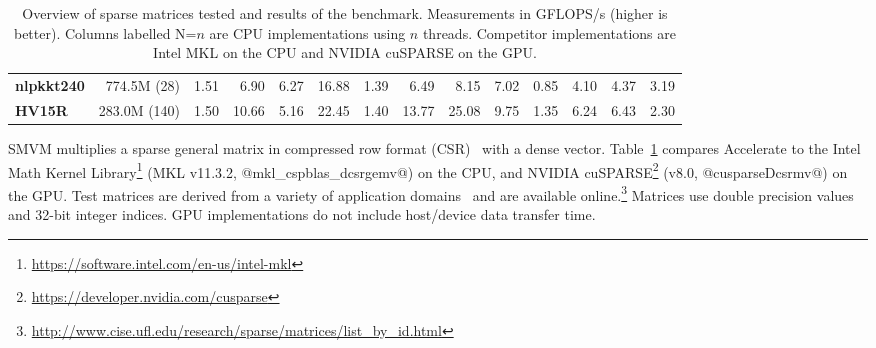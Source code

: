 \begin{table}
\begin{small}
\begin{center}
{\begin{tabular}{lrrrrrrrrrrrrr}
  \textbf{nlpkkt240}    & 774.5M (28)
                        & 1.51
                        & 6.90
                        & 6.27
                        & 16.88
                        & 1.39
                        & 6.49
                        & 8.15
                        & 7.02
                        & 0.85
                        & 4.10
                        & 4.37
                        & 3.19
                        \\

  \textbf{HV15R}        & 283.0M (140)
                        & 1.50
                        & 10.66
                        & 5.16
                        & 22.45
                        & 1.40
                        & 13.77
                        & 25.08
                        & 9.75
                        & 1.35
                        & 6.24
                        & 6.43
                        & 2.30
                        \\

  \bottomrule
\end{tabular}}
\end{center}
\end{small}
\caption{Overview of sparse matrices tested and results of the benchmark.
Measurements in GFLOPS/s (higher is better). Columns labelled N=$n$ are CPU
implementations using $n$ threads. Competitor implementations are Intel MKL on
the CPU and NVIDIA cuSPARSE on the GPU.}
\label{tab:smvm}
\end{table}

SMVM multiplies a sparse general matrix in compressed row format
(CSR)~\cite{Chatterjee:1990vj} with a dense vector. Table~\ref{tab:smvm}
compares Accelerate to the Intel Math Kernel
Library\footnote{\url{https://software.intel.com/en-us/intel-mkl}} (MKL v11.3.2,
@mkl_cspblas_dcsrgemv@) on the CPU, and NVIDIA
cuSPARSE\footnote{\url{https://developer.nvidia.com/cusparse}} (v8.0,
@cusparseDcsrmv@) on the GPU. Test matrices are derived from a variety of
application domains~\cite{sparse_matrix_collection} and are available
online.\footnote{\url{http://www.cise.ufl.edu/research/sparse/matrices/list_by_id.html}}
Matrices use double precision values and 32-bit integer indices. GPU
implementations do not include host/device data transfer time.


